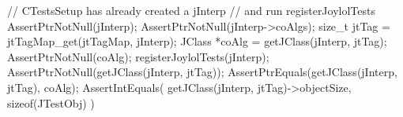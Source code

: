
\startCTest
  // CTestsSetup has already created a jInterp
  // and run registerJoylolTests
  AssertPtrNotNull(jInterp);
  AssertPtrNotNull(jInterp->coAlgs);
  size_t jtTag = jtTagMap_get(jtTagMap, jInterp);
  JClass *coAlg = getJClass(jInterp, jtTag);
  AssertPtrNotNull(coAlg);
  registerJoylolTests(jInterp);
  AssertPtrNotNull(getJClass(jInterp, jtTag));
  AssertPtrEquals(getJClass(jInterp, jtTag), coAlg);
  AssertIntEquals(
    getJClass(jInterp, jtTag)->objectSize,
    sizeof(JTestObj)
  )
\stopCTest
\stopTestCase
\stopTestSuite
